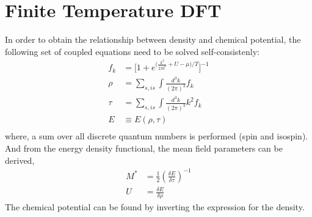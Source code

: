 \documentclass[preprint,prc,preprintnumbers,superscriptaddress,amsmath,amssymb,floatfix]{revtex4-1}
\begin{document}
\section{Finite Temperature DFT}
In order to obtain the relationship between density and chemical potential, the following set of coupled equations need to be solved self-consistenly:
 \begin{equation}
  \begin{split}
  f_k&=\bigg [1+ e^{\big(\frac{k^2}{2M^{*}}+U-\mu \big)/T}\bigg ]^{-1}\\
  \rho &= \sum_{s,is}\int \frac{d^3k}{(2\pi)^3}f_k\\
  \tau &= \sum_{s,is}\int \frac{d^3k}{(2\pi)^3}k^2 f_k\\
  E &\equiv E(\rho,\tau)\\
  \end{split}
  \label{eq:sceq1}
  \end{equation}
  where, a sum over all discrete quantum numbers is performed (spin and isospin).
  And from the energy density functional, the mean field parameters can be derived,
  \begin{equation}
   \begin{split}
  M^{*}&=\frac{1}{2}(\frac{\delta E}{\delta \tau})^{-1}\\
  U &= \frac{\delta E}{\delta \rho}
   \end{split}
   \label{eq:sceq2}
  \end{equation}
The chemical potential can be found 
by inverting the expression for the density.
\end{document}

